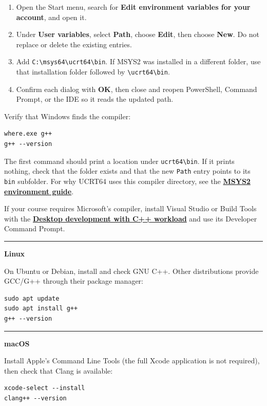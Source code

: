 \begin{enumerate}[leftmargin=1.7em]
  \item Open the Start menu, search for \textbf{Edit environment variables for your account}, and open it.
  \item Under \textbf{User variables}, select \textbf{Path}, choose \textbf{Edit}, then choose \textbf{New}. Do not replace or delete the existing entries.
  \item Add \texttt{C:\textbackslash msys64\textbackslash ucrt64\textbackslash bin}. If MSYS2 was installed in a different folder, use that installation folder followed by \texttt{\textbackslash ucrt64\textbackslash bin}.
  \item Confirm each dialog with \textbf{OK}, then close and reopen PowerShell, Command Prompt, or the IDE so it reads the updated path.
\end{enumerate}

\noindent Verify that Windows finds the compiler:

\begin{lstlisting}[style=utpterminal]
where.exe g++
g++ --version
\end{lstlisting}

\noindent The first command should print a location under
\texttt{ucrt64\textbackslash bin}. If it prints nothing, check that the folder
exists and that the new \texttt{Path} entry points to its \texttt{bin}
subfolder. For why UCRT64 uses this compiler directory, see the
\href{https://www.msys2.org/docs/environments/}{\textbf{MSYS2 environment guide}}.

\noindent If your course requires Microsoft's compiler, install Visual Studio
or Build Tools with the
\href{https://learn.microsoft.com/en-us/cpp/build/vscpp-step-0-installation}{\textbf{Desktop development with C++ workload}} and use its Developer Command Prompt.

\medskip
\noindent\textcolor{UTPBlue!45}{\rule{\linewidth}{0.5pt}}\par
\medskip
\noindent\textbf{Linux}\par
\noindent On Ubuntu or Debian, install and check GNU C++. Other distributions
provide GCC/G++ through their package manager:

\begin{lstlisting}[style=utpterminal]
sudo apt update
sudo apt install g++
g++ --version
\end{lstlisting}

\medskip
\noindent\textcolor{UTPBlue!45}{\rule{\linewidth}{0.5pt}}\par
\medskip
\noindent\textbf{macOS}\par
\noindent Install Apple's Command Line Tools (the full Xcode application is
not required), then check that Clang is available:

\begin{lstlisting}[style=utpterminal]
xcode-select --install
clang++ --version
\end{lstlisting}
